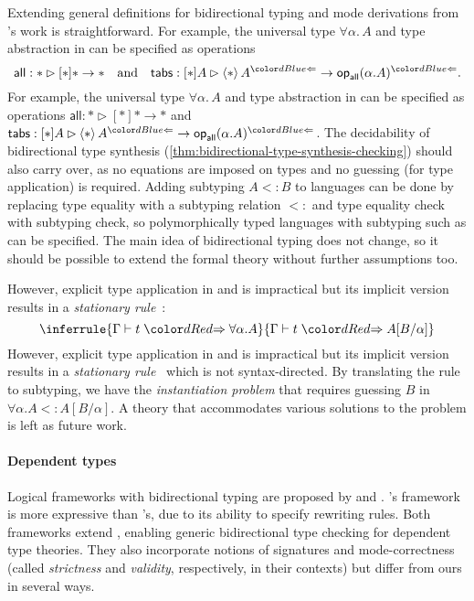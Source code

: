 Extending general definitions for bidirectional typing and mode derivations from \citeauthor{Hamana2011}'s work is straightforward. 
\ifarxiv
For example, the universal type $\forall \alpha.\, A$ and type abstraction in \SystemF can be specified as operations
\[
  \mathsf{all} : * \rhd [*] * \to *
  \quad\text{and}\quad
  \mathsf{tabs} : [*] A \rhd \left< * \right> A^{\chk} \to \tyOp_{\mathsf{all}}(\alpha. A)^{\chk}.
\]
\else
For example, the universal type $\forall \alpha.\, A$ and type abstraction in \SystemF can be specified as operations $\mathsf{all} : * \rhd [*] * \to *$ and $\mathsf{tabs} : [*] A \rhd \left< * \right> A^{\chk} \to \tyOp_{\mathsf{all}}(\alpha. A)^{\chk}$.
\fi
The decidability of bidirectional type synthesis (\cref{thm:bidirectional-type-synthesis-checking}) should also carry over, as no equations are imposed on types and no guessing (for type application) is required.
Adding subtyping $A \mathrel{<:} B$ to languages can be done by replacing type equality with a subtyping relation $\mathrel{<:}$ and type equality check with subtyping check, so polymorphically typed languages with subtyping such as \SystemFsub can be specified.
The main idea of bidirectional typing does not change, so it should be possible to extend the formal theory without further assumptions too.

\ifarxiv
However, explicit type application in \SystemF and \SystemFsub is impractical but its implicit version results in a \emph{stationary rule}~\cite{Leivant1986}:
\[
  \inferrule{\Gamma \vdash t \syn \forall \alpha. A}{\Gamma \vdash t \syn A[B/\alpha]}
\]
\else
However, explicit type application in \SystemF and \SystemFsub is impractical but its implicit version results in a \emph{stationary rule}~\cite{Leivant1986}
\fi
which is not syntax-directed.
By translating the rule to subtyping, we have the \emph{instantiation problem} that requires guessing $B$ in $\forall \alpha. A <: A[B/\alpha]$.
A theory that accommodates various solutions to the problem is left as future work.

\paragraph{Dependent types}
Logical frameworks with bidirectional typing are proposed by \citet{Reed2008} and \citet{Felicissimo2023}.
\citeauthor{Felicissimo2023}'s framework is more expressive than \citeauthor{Reed2008}'s, due to its ability to specify rewriting rules.
Both frameworks extend \LF, enabling generic bidirectional type checking for dependent type theories.
They also incorporate notions of signatures and mode-correctness (called \emph{strictness} and \emph{validity}, respectively, in their contexts) but differ from ours in several ways.


